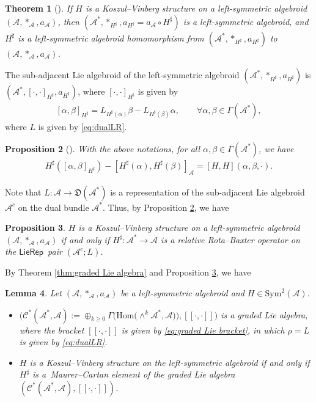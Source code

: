 \documentclass[10pt,a4paper]{amsart}
\numberwithin{equation}{section}
\newtheorem{thm}{Theorem}[section]
\newtheorem{lem}[thm]{Lemma}
\newtheorem{pro}[thm]{Proposition}
\newcommand{\huaA}{\mathcal{A}}
\newcommand{\huaC}{\mathcal{C}}
\newcommand{\frkD}{\mathfrak D}
\newcommand{\Courant}[1]{\left[\!\left[ #1\right]\!\right]}
\newcommand{\Hom}{\mathrm{Hom}}
\newcommand{\Sym}{\mathrm{Sym}}
\newcommand{\LP}{$\mathsf{LieRep}$~}
\begin{document}
{\sloppy\begin{thm}[\cite{lsb2}]\label{thm:LSBi-H}
If $H$ is a Koszul--Vinberg structure on a left-symmetric algebroid $(\huaA,\ast_\huaA,a_\huaA)$, then $(\huaA^*,\ast_{H^\sharp},a_{H^\sharp}=a_\huaA\circ H^\sharp)$ is a left-symmetric algebroid, and $H^\sharp$ is a left-symmetric algebroid homomorphism from $(\huaA^*,\ast_{H^\sharp},a_{H^\sharp})$ to $(\huaA,\ast_\huaA,a_\huaA)$.
\end{thm}}

{\sloppy The sub-adjacent Lie algebroid of the left-symmetric algebroid $(\huaA^*,\ast_{H^\sharp},a_{H^\sharp})$ is $(\huaA^*,[\cdot,\cdot]_{H^\sharp},a_{H^\sharp})$, where $[\cdot,\cdot]_{H^\sharp}$ is given by
\begin{gather}\label{eq:commutator-H}
 [\alpha,\beta]_{H^\sharp}=L_{H^\sharp(\alpha)}\beta-L_{H^\sharp(\beta)}\alpha,\qquad
 \forall \alpha,\beta\in\Gamma(\huaA^*),
\end{gather}}\noindent
where $L$ is given by \eqref{eq:dualLR}.


\begin{pro}[\cite{lsb2}]\label{pro:morphism}
With the above notations,
for all $\alpha,\beta\in\Gamma(\huaA^*)$, we have
\begin{gather*}
H^\sharp({[\alpha,\beta]}_{H^\sharp})-[H^\sharp(\alpha), H^\sharp(\beta)]_\huaA=[ H,H](\alpha,\beta,\cdot).
\end{gather*}
\end{pro}


Note that $L\colon \huaA\longrightarrow \frkD(\huaA^*)$ is a representation of the sub-adjacent Lie algebroid $\huaA^c$ on the dual bundle $\huaA^*$. Thus, by Proposition \ref{pro:morphism}, we have
\begin{pro}\label{pro:LSBi-H}
 $H$ is a Koszul--Vinberg structure on a left-symmetric algebroid $(\huaA,\ast_\huaA,a_\huaA)$ if and only if $H^\sharp\colon \huaA^*\longrightarrow \huaA $ is a relative Rota--Baxter operator on the \LP pair $(\huaA^c;L)$.
\end{pro}

By Theorem \ref{thm:graded Lie algebra} and Proposition \ref{pro:LSBi-H}, we have
\begin{lem}\label{lem:graded Lie algbra}
Let $(\huaA,\ast_\huaA,a_\huaA)$ be a left-symmetric algebroid and $H\in \Sym^2(\huaA)$.	
\begin{itemize}\itemsep=0pt
\item[$(i)$] $\big(\huaC^*(\huaA^*,\huaA):=\oplus_{k\geq0}\Gamma\big(\Hom\big({\wedge}^{k}\huaA^*,\huaA\big)\big),\Courant{\cdot,\cdot}\big)$ is a graded Lie algebra, where the bracket $\Courant{\cdot,\cdot}$ is given by \eqref{eq:graded Lie bracket}, in which $\rho=L$ is given by \eqref{eq:dualLR}.
\item[$(ii)$] $H$ is a Koszul--Vinberg structure on the left-symmetric algebroid if and only if $H^\sharp$ is a~Maurer--Cartan element of the graded Lie algebra $(\huaC^*(\huaA^*,\huaA),\Courant{\cdot,\cdot})$.
\end{itemize}
\end{lem}
\end{document}
